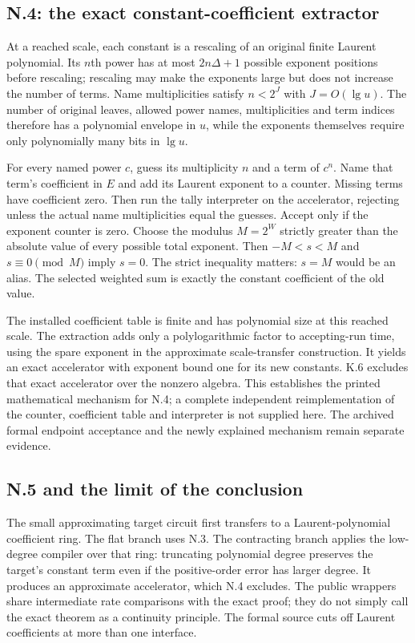 \documentclass[11pt,letterpaper]{article}
\theoremstyle{definition}\newtheorem{definition}[theorem]{Definition}\newtheorem{example}[theorem]{Example}
\theoremstyle{remark}\newtheorem{remark}[theorem]{Remark}
\begin{document}
\subsection{N.4: the exact constant-coefficient extractor}
At a reached scale, each constant is a rescaling of an original finite Laurent polynomial. Its $n$th power has at most $2n\Delta+1$ possible exponent positions before rescaling; rescaling may make the exponents large but does not increase the number of terms. Name multiplicities satisfy $n<2^J$ with $J=O(\lg u)$. The number of original leaves, allowed power names, multiplicities and term indices therefore has a polynomial envelope in $u$, while the exponents themselves require only polynomially many bits in $\lg u$.

For every named power $c$, guess its multiplicity $n$ and a term of $c^n$. Name that term's coefficient in $E$ and add its Laurent exponent to a counter. Missing terms have coefficient zero. Then run the tally interpreter on the accelerator, rejecting unless the actual name multiplicities equal the guesses. Accept only if the exponent counter is zero. Choose the modulus $M=2^W$ strictly greater than the absolute value of every possible total exponent. Then $-M<s<M$ and $s\equiv0\pmod M$ imply $s=0$. The strict inequality matters: $s=M$ would be an alias. The selected weighted sum is exactly the constant coefficient of the old value.

The installed coefficient table is finite and has polynomial size at this reached scale. The extraction adds only a polylogarithmic factor to accepting-run time, using the spare exponent in the approximate scale-transfer construction. It yields an exact accelerator with exponent bound one for its new constants. K.6 excludes that exact accelerator over the nonzero algebra. This establishes the printed mathematical mechanism for N.4; a complete independent reimplementation of the counter, coefficient table and interpreter is not supplied here. The archived formal endpoint acceptance and the newly explained mechanism remain separate evidence.

\subsection{N.5 and the limit of the conclusion}
The small approximating target circuit first transfers to a Laurent-polynomial coefficient ring. The flat branch uses N.3. The contracting branch applies the low-degree compiler over that ring: truncating polynomial degree preserves the target's constant term even if the positive-order error has larger degree. It produces an approximate accelerator, which N.4 excludes. The public wrappers share intermediate rate comparisons with the exact proof; they do not simply call the exact theorem as a continuity principle. The formal source cuts off Laurent coefficients at more than one interface.
\end{document}
